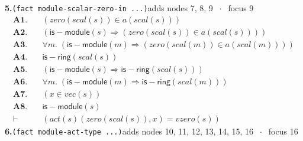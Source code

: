 \documentclass[11pt]{article}
\begin{document}
\medskip\noindent\textbf{5.}\quad \texttt{(fact module-scalar-zero-in ...)}\hfill{\small adds nodes 7, 8, 9 $\;\cdot\;$ focus 9}\\[2pt]
\begin{align*}
  \mathbf{A1.}\quad & (\mathit{zero}(\mathit{scal}(s)) \in a(\mathit{scal}(s))) \\
  \mathbf{A2.}\quad & (\mathsf{is{-}module}(s) \Rightarrow (\mathit{zero}(\mathit{scal}(s)) \in a(\mathit{scal}(s)))) \\
  \mathbf{A3.}\quad & \forall m.\; (\mathsf{is{-}module}(m) \Rightarrow (\mathit{zero}(\mathit{scal}(m)) \in a(\mathit{scal}(m)))) \\
  \mathbf{A4.}\quad & \mathsf{is{-}ring}(\mathit{scal}(s)) \\
  \mathbf{A5.}\quad & (\mathsf{is{-}module}(s) \Rightarrow \mathsf{is{-}ring}(\mathit{scal}(s))) \\
  \mathbf{A6.}\quad & \forall m.\; (\mathsf{is{-}module}(m) \Rightarrow \mathsf{is{-}ring}(\mathit{scal}(m))) \\
  \mathbf{A7.}\quad & (x \in \mathit{vec}(s)) \\
  \mathbf{A8.}\quad & \mathsf{is{-}module}(s) \\
  \vdash\quad & (\mathit{act}(s)(\mathit{zero}(\mathit{scal}(s)), x) = \mathit{vzero}(s))
\end{align*}
\medskip\noindent\textbf{6.}\quad \texttt{(fact module-act-type ...)}\hfill{\small adds nodes 10, 11, 12, 13, 14, 15, 16 $\;\cdot\;$ focus 16}\\[2pt]
\end{document}
